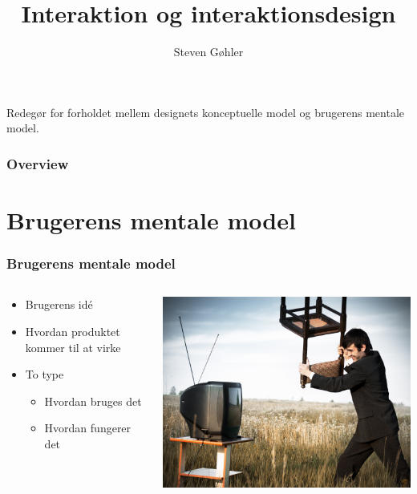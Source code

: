 \documentclass{beamer}
\title{Interaktion og interaktionsdesign}
\author{Steven Gøhler}
\begin{document}
\begin{frame}
\titlepage
Redegør for forholdet mellem designets konceptuelle model og brugerens mentale model.
\end{frame}

\begin{frame}
  \frametitle{Overview}
  \tableofcontents
\end{frame}

\section{Brugerens mentale model}
\begin{frame}
\frametitle{Brugerens mentale model}
  \begin{columns}[T]
    \begin{column}{.5\textwidth}
	  \begin{itemize}
		\item Brugerens idé
		\item Hvordan produktet kommer til at virke
	    \item To type
	    \begin{itemize}
	      \item Hvordan bruges det
	      \item Hvordan fungerer det
	    \end{itemize}
	  \end{itemize}
    \end{column}
    \begin{column}{.5\textwidth}
      \includegraphics[width=\textwidth]{television.jpg}
    \end{column}
  \end{columns}
\end{frame}
\end{document}

